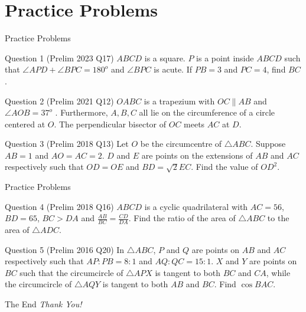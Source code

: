 \documentclass{beamer}
\begin{document}
\section{Practice Problems}
\begin{frame}{Practice Problems}
	\begin{block}{Question 1}
		(Prelim 2023 Q17) $ABCD$ is a square. $P$ is a point inside $ABCD$ such that $\angle APD + \angle BPC = 180^o$ and  $\angle BPC$ is acute.  If $PB = 3$ and $PC = 4$, find $BC$.
	\end{block}
	\begin{block}{Question 2}
		(Prelim 2021 Q12) $OABC$ is a trapezium with $OC \parallel AB$ and $\angle AOB = 37^o$	. Furthermore, $A,B,C$ all lie on the circumference of a circle centered at $O$. The perpendicular bisector of $OC$ meets $AC$ at $D$.
	\end{block}
	\begin{block}{Question 3}
		(Prelim 2018 Q13) Let $O$ be the circumcentre of $\triangle ABC$. Suppose $AB = 1$ and $AO = AC = 2$. $D$ and $E$ are points on the extensions of $AB$ and $A C$ respectively such that $OD = OE $ and $BD = \sqrt{2} EC$. Find the value of $OD^2$.
	\end{block}
\end{frame}
\begin{frame}{Practice Problems}
	\begin{block} {Question 4}
		(Prelim 2018 Q16) $ABCD$ is a cyclic quadrilateral with $AC=56$, $BD=65$, $BC>DA$ and $\frac{AB}{BC} = \frac{CD}{DA}$. Find the ratio of the area of $\triangle ABC$ to the area of $\triangle ADC$.
	\end{block}
	\begin{block} {Question 5}
		(Prelim 2016 Q20) In $\triangle ABC$, $P$ and $Q$ are points on $AB$ and $AC$ respectively such that $AP:PB=8:1$ and $AQ:QC=15:1$.  $X$ and $Y$ are points on $BC$ such that the circumcircle of $\triangle APX$ is tangent to both $BC$ and $CA$, while the circumcircle of  $\triangle AQY$ is tangent to both $AB$ and $BC$. Find $\cos BAC$.
	\end{block}
\end{frame}


\begin{frame}{The End}
  \centering \Large
  \emph{Thank You!}
\end{frame}
\end{document}
